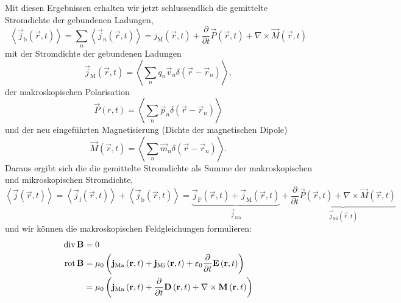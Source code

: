 Mit diesen Ergebnissen erhalten wir jetzt schlussendlich die gemittelte Stromdichte der gebundenen Ladungen,
\begin{equation*}
	\left\langle \vec {j}_{\mathrm{b}}\left(\vec {r},t\right)\right\rangle =\sum _{n}\left\langle \vec {j}_{n}\left(\vec {r},t\right)\right\rangle =j_{\mathrm{M}}\left(\vec {r},t\right)+\frac{\partial }{\partial t}\vec {P}\left(\vec {r},t\right)+\nabla \times \vec {M}\left(\vec {r},t\right)
\end{equation*}
mit der Stromdichte der gebundenen Ladungen
\begin{equation*}
	\vec {j}_{\mathrm{M}}\left(\vec {r},t\right)=\left\langle \sum _{n}q_{n}\vec {v}_{n}\delta \left(\vec {r}-\vec {r}_{n}\right)\right\rangle ,
\end{equation*}
der makroskopischen Polarisation
\begin{equation*}
	\vec {P}\left(r,t\right)=\left\langle \sum _{n}\vec {p}_{n}\delta \left(\vec {r}-\vec {r}_{n}\right)\right\rangle
\end{equation*}
und der neu eingeführten Magnetisierung (Dichte der magnetischen Dipole)
\begin{equation*}
	\vec {M}\left(\vec {r},t\right)=\left\langle \sum _{n}\vec {m}_{n}\delta \left(\vec {r}-\vec {r}_{n}\right)\right\rangle .
\end{equation*}
Daraus ergibt sich die die gemittelte Stromdichte als Summe der makroskopischen und mikroskopischen Stromdichte,
\begin{equation*}
	\left\langle \vec {j}\left(\vec {r},t\right)\right\rangle =\left\langle \vec {j}_{\mathrm{f}}\left(\vec {r},t\right)\right\rangle +\left\langle \vec {j}_{\mathrm{b}}\left(\vec {r},t\right)\right\rangle =\underset{\vec {j}_{\mathrm{Ma}}}{\underbrace{\vec {j}_{\mathrm{F}}\left(\vec {r},t\right)+\vec {j}_{\mathrm{M}}\left(\vec {r},t\right)}}+\underset{\vec {j}_{\mathrm{Mi}}\left(\vec {r},t\right)}{\underbrace{\frac{\partial }{\partial t}\vec {P}\left(\vec {r},t\right)+\nabla \times \vec {M}\left(\vec {r},t\right)}}
\end{equation*}
und wir können die makroskopischen Feldgleichungen formulieren:
\begin{align*}
	\operatorname{div} \mathbf{B}&=0 \\
	\operatorname{rot} \mathbf{B}&=\mu _{0}\left(\mathbf{j}_{\mathrm{Ma}}\left(\mathbf{r},t\right)+\mathbf{j}_{\mathrm{Mi}}\left(\mathbf{r},t\right)+\varepsilon _{0}\frac{\partial }{\partial t}\mathbf{E}\left(\mathbf{r},t\right)\right)\\
	&=\mu _{0}\left(\mathbf{j}_{\mathrm{Ma}}\left(\mathbf{r},t\right)+\frac{\partial }{\partial t}\mathbf{D}\left(\mathbf{r},t\right)+\nabla \times \mathbf{M}\left(\mathbf{r},t\right)\right)
\end{align*}
